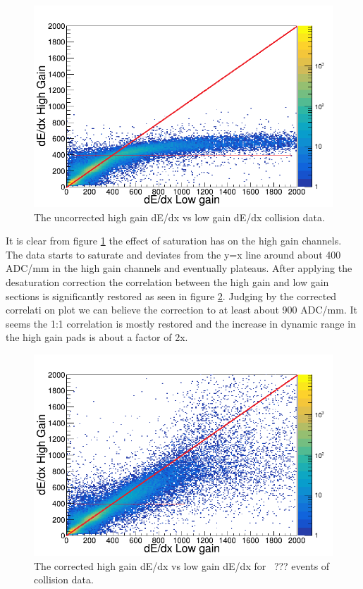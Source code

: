 \documentclass[review]{elsarticle}
\begin{document}
\begin{figure}[ht]
\includegraphics[width=\linewidth]{lowvshigh_raw_cuts}
\caption{The uncorrected high gain dE/dx vs low gain dE/dx collision data.  }
\label{fig:lowvshigh_raw}
\end{figure}
 
It is clear from figure \ref{fig:lowvshigh_raw} the effect of saturation has on the high gain channels. The data starts to saturate and deviates from the y=x line around about 400 ADC/mm in the high gain channels and eventually plateaus.  After applying the desaturation correction the correlation between the high gain and low gain sections is significantly restored as seen in figure \ref{fig:lowvshigh_desat}. Judging by the corrected correlati on plot we can believe the correction to at least about 900 ADC/mm. It seems the 1:1 correlation is mostly restored and the increase in dynamic range in the high gain pads is about a factor of 2x.

\begin{figure}[ht]
\includegraphics[width=\linewidth]{lowvshigh_desat}
\caption{The corrected high gain dE/dx vs low gain dE/dx for ~??? events of collision data.  }
\label{fig:lowvshigh_desat}
\end{figure}
\end{document}
